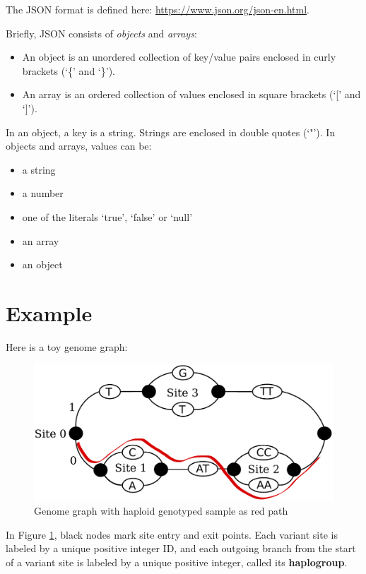 The JSON format is defined here:
\url{https://www.json.org/json-en.html}.

Briefly, JSON consists of \emph{objects} and \emph{arrays}:

\begin{itemize}
\tightlist
\item
  An object is an unordered collection of key/value pairs enclosed in
  curly brackets (`\{' and `\}').
\item
  An array is an ordered collection of values enclosed in square
  brackets (`{[}' and `{]}').
\end{itemize}

In an object, a key is a string. Strings are enclosed in double quotes
(`"'). In objects and arrays, values can be:

\begin{itemize}
\tightlist
\item
  a string
\item
  a number
\item
  one of the literals `true', `false' or `null'
\item
  an array
\item
  an object
\end{itemize}

\newpage

\hypertarget{example}{%
\section{Example}\label{example}}

Here is a toy genome graph:

\begin{figure}
\centering
\includegraphics{img/example_graph.pdf}
\caption{Genome graph with haploid genotyped sample as red path
\label{toy_graph}}
\end{figure}

In Figure \ref{toy_graph}, black nodes mark site entry and exit points.
Each variant site is labeled by a unique positive integer ID, and each
outgoing branch from the start of a variant site is labeled by a unique
positive integer, called its \textbf{haplogroup}.

